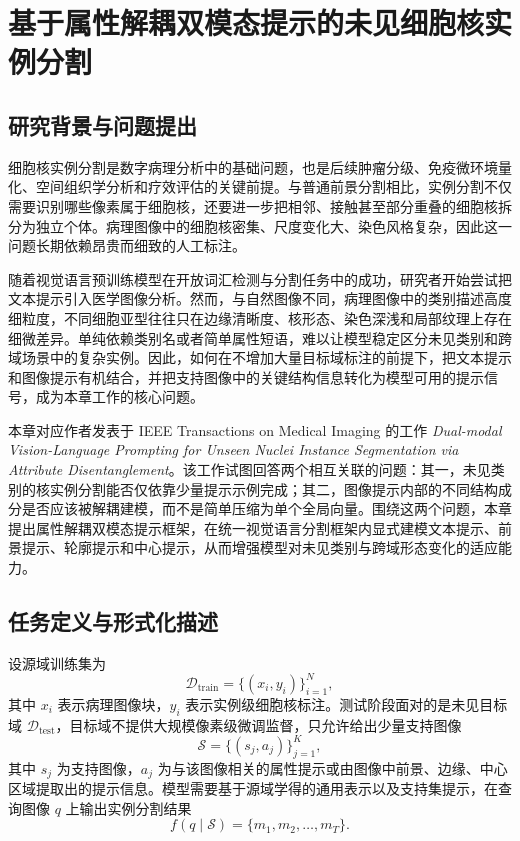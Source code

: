 \chapter{基于属性解耦双模态提示的未见细胞核实例分割}

\section{研究背景与问题提出}
细胞核实例分割是数字病理分析中的基础问题，也是后续肿瘤分级、免疫微环境量化、空间组织学分析和疗效评估的关键前提。与普通前景分割相比，实例分割不仅需要识别哪些像素属于细胞核，还要进一步把相邻、接触甚至部分重叠的细胞核拆分为独立个体。病理图像中的细胞核密集、尺度变化大、染色风格复杂，因此这一问题长期依赖昂贵而细致的人工标注。

随着视觉语言预训练模型在开放词汇检测与分割任务中的成功，研究者开始尝试把文本提示引入医学图像分析。然而，与自然图像不同，病理图像中的类别描述高度细粒度，不同细胞亚型往往只在边缘清晰度、核形态、染色深浅和局部纹理上存在细微差异。单纯依赖类别名或者简单属性短语，难以让模型稳定区分未见类别和跨域场景中的复杂实例。因此，如何在不增加大量目标域标注的前提下，把文本提示和图像提示有机结合，并把支持图像中的关键结构信息转化为模型可用的提示信号，成为本章工作的核心问题。

本章对应作者发表于 IEEE Transactions on Medical Imaging 的工作 \emph{Dual-modal Vision-Language Prompting for Unseen Nuclei Instance Segmentation via Attribute Disentanglement}。该工作试图回答两个相互关联的问题：其一，未见类别的核实例分割能否仅依靠少量提示示例完成；其二，图像提示内部的不同结构成分是否应该被解耦建模，而不是简单压缩为单个全局向量。围绕这两个问题，本章提出属性解耦双模态提示框架，在统一视觉语言分割框架内显式建模文本提示、前景提示、轮廓提示和中心提示，从而增强模型对未见类别与跨域形态变化的适应能力。

\section{任务定义与形式化描述}
设源域训练集为
\[
\mathcal{D}_{\text{train}}=\{(x_i, y_i)\}_{i=1}^{N},
\]
其中 $x_i$ 表示病理图像块，$y_i$ 表示实例级细胞核标注。测试阶段面对的是未见目标域 $\mathcal{D}_{\text{test}}$，目标域不提供大规模像素级微调监督，只允许给出少量支持图像
\[
\mathcal{S}=\{(s_j, a_j)\}_{j=1}^{K},
\]
其中 $s_j$ 为支持图像，$a_j$ 为与该图像相关的属性提示或由图像中前景、边缘、中心区域提取出的提示信息。模型需要基于源域学得的通用表示以及支持集提示，在查询图像 $q$ 上输出实例分割结果
\[
f(q \mid \mathcal{S}) = \{m_1,m_2,\dots,m_T\}.
\]

